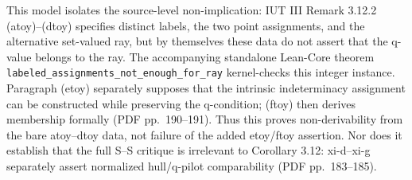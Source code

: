 \documentclass[11pt]{article}
\begin{document}
This model isolates the source-level non-implication: IUT III Remark 3.12.2 (atoy)--(dtoy) specifies distinct labels, the two point assignments, and the alternative set-valued ray, but by themselves these data do not assert that the q-value belongs to the ray. The accompanying standalone Lean-Core theorem \texttt{labeled\_assignments\_not\_enough\_for\_ray} kernel-checks this integer instance. Paragraph (etoy) separately supposes that the intrinsic indeterminacy assignment can be constructed while preserving the q-condition; (ftoy) then derives membership formally (PDF pp.~190--191). Thus this proves non-derivability from the bare atoy--dtoy data, not failure of the added etoy/ftoy assertion. Nor does it establish that the full S--S critique is irrelevant to Corollary 3.12: xi-d--xi-g separately assert normalized hull/q-pilot comparability (PDF pp.~183--185).
\end{document}
